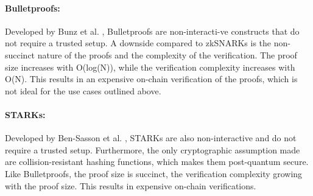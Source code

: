 \documentclass[../../thesis.tex]{subfiles}
\begin{document}
\paragraph{Bulletproofs:}
Developed by Bunz et al. \cite{bunz2018bulletproofs}, Bulletproofs are non-interacti\hyp ve constructs that do not require a trusted setup. A downside compared to zkSNARKs is the non-succinct nature of the proofs and the complexity of the verification. The proof size increases with O(log(N)), while the verification complexity increases with O(N). This results in an expensive on-chain verification of the proofs, which is not ideal for the use cases outlined above.

\paragraph{STARKs:}
Developed by Ben-Sasson et al. \cite{ben2018scalable}, STARKs are also non-interactive and do not require a trusted setup. Furthermore, the only cryptographic assumption made are collision-resistant hashing functions, which makes them post-quantum secure. Like Bulletproofs, the proof size is succinct, the verification complexity growing with the proof size. This results in expensive on-chain verifications.
\end{document}
